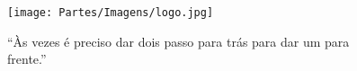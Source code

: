 %
% 
% 
\begin{figure}[h]
\captionsetup[subfigure]{labelformat=empty}
\caption{``Às vezes é preciso dar dois passo para trás para dar um para frente.''}
\texttt{[image: Partes/Imagens/logo.jpg]}
\end{figure}
% 
% 
